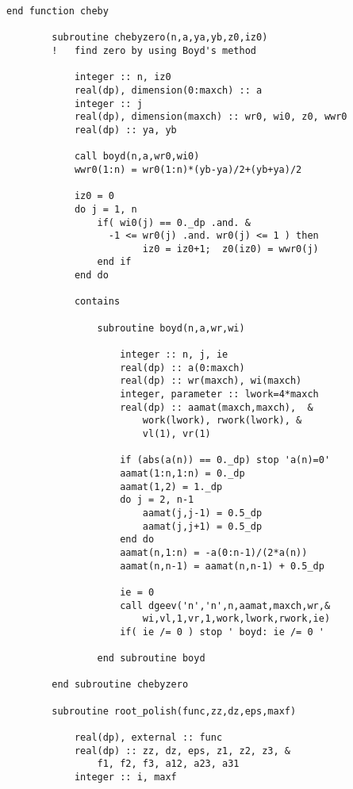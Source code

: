\documentclass[12pt]{article}
\begin{document}
\begin{lstlisting}[frame=single,caption={Module {\tt cheby.f90}},label=cheby2]
        end function cheby
                
        subroutine chebyzero(n,a,ya,yb,z0,iz0) 
        !   find zero by using Boyd's method
        
            integer :: n, iz0
            real(dp), dimension(0:maxch) :: a
            integer :: j
            real(dp), dimension(maxch) :: wr0, wi0, z0, wwr0
            real(dp) :: ya, yb
            
            call boyd(n,a,wr0,wi0)
            wwr0(1:n) = wr0(1:n)*(yb-ya)/2+(yb+ya)/2
            
            iz0 = 0
            do j = 1, n
                if( wi0(j) == 0._dp .and. &
                  -1 <= wr0(j) .and. wr0(j) <= 1 ) then 
                        iz0 = iz0+1;  z0(iz0) = wwr0(j)
                end if
            end do
                        
            contains
                
                subroutine boyd(n,a,wr,wi)
                
                    integer :: n, j, ie
                    real(dp) :: a(0:maxch)
                    real(dp) :: wr(maxch), wi(maxch)
                    integer, parameter :: lwork=4*maxch
                    real(dp) :: aamat(maxch,maxch),  &
                        work(lwork), rwork(lwork), &
                        vl(1), vr(1)
                    
                    if (abs(a(n)) == 0._dp) stop 'a(n)=0'
                    aamat(1:n,1:n) = 0._dp
                    aamat(1,2) = 1._dp
                    do j = 2, n-1
                        aamat(j,j-1) = 0.5_dp
                        aamat(j,j+1) = 0.5_dp
                    end do
                    aamat(n,1:n) = -a(0:n-1)/(2*a(n))
                    aamat(n,n-1) = aamat(n,n-1) + 0.5_dp
                    
                    ie = 0
                    call dgeev('n','n',n,aamat,maxch,wr,&
                        wi,vl,1,vr,1,work,lwork,rwork,ie)                      
                    if( ie /= 0 ) stop ' boyd: ie /= 0 ' 
                            
                end subroutine boyd
                
        end subroutine chebyzero
        
        subroutine root_polish(func,zz,dz,eps,maxf)
        
            real(dp), external :: func
            real(dp) :: zz, dz, eps, z1, z2, z3, &
                f1, f2, f3, a12, a23, a31
            integer :: i, maxf
            

\end{lstlisting}
\end{document}
